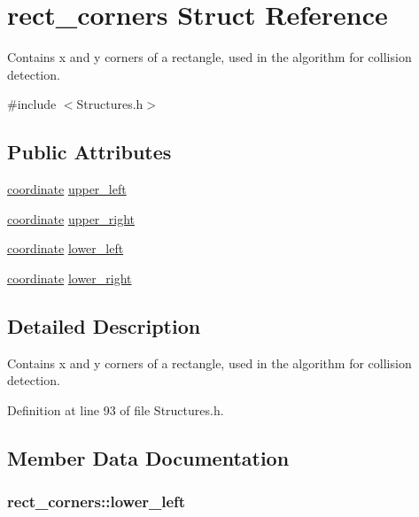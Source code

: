 \hypertarget{structrect__corners}{\section{rect\-\_\-corners Struct Reference}
\label{structrect__corners}
}


Contains x and y corners of a rectangle, used in the algorithm for collision detection.  




{\ttfamily \#include $<$Structures.\-h$>$}

\subsection*{Public Attributes}
\begin{DoxyCompactItemize}
\item 
\hyperlink{structcoordinate}{coordinate} \hyperlink{structrect__corners_a48cd191550e65bd24a7d8018c7eefd53}{upper\-\_\-left}
\item 
\hyperlink{structcoordinate}{coordinate} \hyperlink{structrect__corners_a631310450f151fd6c92132d5d7216259}{upper\-\_\-right}
\item 
\hyperlink{structcoordinate}{coordinate} \hyperlink{structrect__corners_a2960e4888d6a9621429044e426950bc8}{lower\-\_\-left}
\item 
\hyperlink{structcoordinate}{coordinate} \hyperlink{structrect__corners_aa499428b9c692d61e1b43d059156a5af}{lower\-\_\-right}
\end{DoxyCompactItemize}


\subsection{Detailed Description}
Contains x and y corners of a rectangle, used in the algorithm for collision detection. 

Definition at line 93 of file Structures.\-h.



\subsection{Member Data Documentation}
\hypertarget{structrect__corners_a2960e4888d6a9621429044e426950bc8}{
\subsubsection[{lower\-\_\-left}]{ rect\-\_\-corners\-::lower\-\_\-left}}\label{structrect__corners_a2960e4888d6a9621429044e426950bc8}


